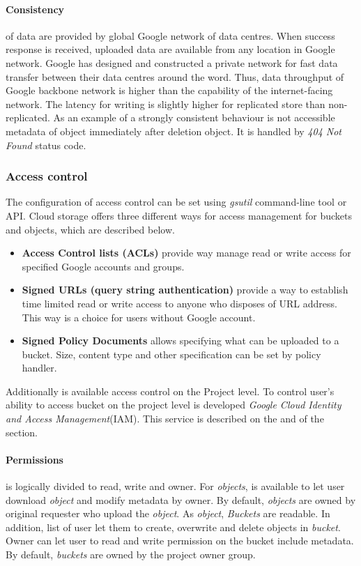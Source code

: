 \documentclass[a4paper,12pt,oneside]{report}
\begin{document}
\paragraph{Consistency} of data are provided by global Google network of data centres. 
When success response is received, uploaded data are available from any location in 
Google network. Google has designed and constructed a private network 
for fast data transfer between their data centres around the word. Thus, data throughput 
of Google backbone network is higher than the capability of the 
internet-facing network. The latency for writing is slightly higher for replicated store 
than non-replicated. As an example of a strongly consistent behaviour 
is not accessible metadata of object immediately after deletion object. 
It is handled by \textit{404 Not Found} status code.


\subsubsection{Access control}
The configuration of access control can be set using \textit{gsutil} command-line tool 
or API. Cloud storage offers three different ways for access management for buckets and objects, which are described below.
\begin{itemize}
\item\textbf{Access Control lists (ACLs)} provide way manage read or write access for 
specified Google accounts and groups.
\item\textbf{Signed URLs (query string authentication)} provide a way to establish time 
limited read or write access to anyone who disposes of URL address. This way is a choice for users without Google account.   
\item\textbf{Signed Policy Documents} allows specifying what can be uploaded to a bucket. 
Size, content type and other specification can be set by policy handler. 
\end{itemize}
Additionally is available access control on the Project level. To control user's ability 
to access bucket on the project level is developed   \textit{Google Cloud Identity and Access Management}(IAM). This service is described on 
the and of the section.

\paragraph{Permissions} is logically divided to read, write and owner. For \textit{objects}, 
is available to let user download \textit{object} and modify metadata by owner. By 
default, \textit{objects} are owned by original requester who 
upload the \textit{object}. As \textit{object}, \textit{Buckets} are readable. In 
addition, list of user let them to create, overwrite and delete objects 
in \textit{bucket}. Owner can let user to read and write permission on the bucket 
include metadata. By default, \textit{buckets} are owned by the project 
owner group.
\end{document}
